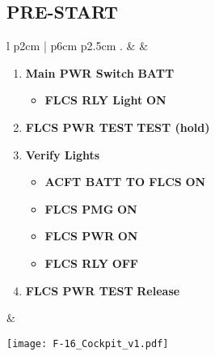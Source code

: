 \documentclass[fontHelvetica]{TechCheck}
\begin{document}
	\subsection{PRE-START}
	\begin{center}
		\begin{longtable}{l p{2cm} | p{6cm} p{2.5cm}}
			. &  &
			\begin{minipage}[t]{\linewidth}
				\vspace{-7pt}
				\begin{enumerate}
					\item \textbf{Main PWR Switch} \dotfill \textbf{BATT}
					\begin{itemize}
						\item \textbf{FLCS RLY Light} \dotfill \textbf{ON}
					\end{itemize}
					\item \textbf{FLCS PWR TEST} \dotfill \textbf{TEST (hold)}
					\item \textbf{Verify Lights}
					\begin{itemize}
						\item \textbf{ACFT BATT TO FLCS} \dotfill \textbf{ON}
						\item \textbf{FLCS PMG} \dotfill \textbf{ON}
						\item \textbf{FLCS PWR} \dotfill \textbf{ON}
						\item \textbf{FLCS RLY} \dotfill \textbf{OFF}
					\end{itemize}
					\item \textbf{FLCS PWR TEST} \dotfill \textbf{Release}
				\end{enumerate}
			\end{minipage} &
			\begin{minipage}[t]{\linewidth}
				\vspace{-7pt}
				\centering
				\texttt{[image: F-16\_Cockpit\_v1.pdf]}
			\end{minipage} \\
			\bottomrule
		\end{longtable}
	\end{center}

	\clearpage
\end{document}

